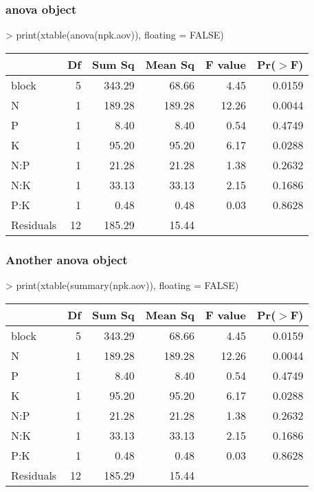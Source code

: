 \documentclass[letterpaper]{article}
\begin{document}
\subsubsection{anova object}
\begin{Schunk}
\begin{Sinput}
> print(xtable(anova(npk.aov)), floating = FALSE)
\end{Sinput}
% latex table generated in R 2.6.0 by xtable 1.5-2 package
% Wed Oct 10 14:26:36 2007
\begin{tabular}{lrrrrr}
  \hline
 & Df & Sum Sq & Mean Sq & F value & Pr($>$F) \\
  \hline
block & 5 & 343.29 & 68.66 & 4.45 & 0.0159 \\
  N & 1 & 189.28 & 189.28 & 12.26 & 0.0044 \\
  P & 1 & 8.40 & 8.40 & 0.54 & 0.4749 \\
  K & 1 & 95.20 & 95.20 & 6.17 & 0.0288 \\
  N:P & 1 & 21.28 & 21.28 & 1.38 & 0.2632 \\
  N:K & 1 & 33.13 & 33.13 & 2.15 & 0.1686 \\
  P:K & 1 & 0.48 & 0.48 & 0.03 & 0.8628 \\
  Residuals & 12 & 185.29 & 15.44 &  &  \\
   \hline
\end{tabular}\end{Schunk}

\subsubsection{Another anova object}
\begin{Schunk}
\begin{Sinput}
> print(xtable(summary(npk.aov)), floating = FALSE)
\end{Sinput}
% latex table generated in R 2.6.0 by xtable 1.5-2 package
% Wed Oct 10 14:26:36 2007
\begin{tabular}{lrrrrr}
  \hline
 & Df & Sum Sq & Mean Sq & F value & Pr($>$F) \\
  \hline
block       & 5 & 343.29 & 68.66 & 4.45 & 0.0159 \\
  N           & 1 & 189.28 & 189.28 & 12.26 & 0.0044 \\
  P           & 1 & 8.40 & 8.40 & 0.54 & 0.4749 \\
  K           & 1 & 95.20 & 95.20 & 6.17 & 0.0288 \\
  N:P         & 1 & 21.28 & 21.28 & 1.38 & 0.2632 \\
  N:K         & 1 & 33.13 & 33.13 & 2.15 & 0.1686 \\
  P:K         & 1 & 0.48 & 0.48 & 0.03 & 0.8628 \\
  Residuals   & 12 & 185.29 & 15.44 &  &  \\
   \hline
\end{tabular}\end{Schunk}
\end{document}
